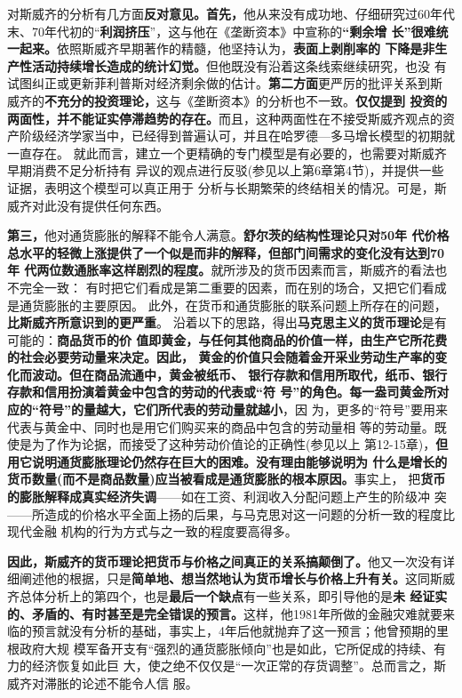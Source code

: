 对斯威齐的分析有几方面\textbf{反对意见。首先，}他从来没有成功地、仔细研究过60年代
末、70年代初的“\textbf{利润挤压}”，这与他在《垄断资本》中宣称的\textbf{“剩余增
  长”很难统一起来。}依照斯威齐早期著作的精髓，他坚持认为，\textbf{表面上剥削率的
  下降是非生产性活动持续增长造成的统计幻觉。}但他既没有沿着这条线索继续研究，也没
有试图纠正或更新菲利普斯对经济剩余做的估计。\textbf{第二方面}更严厉的批评关系到斯
威齐的\textbf{不充分的投资理论，}这与《垄断资本》的分析也不一致。\textbf{仅仅提到
  投资的两面性，并不能证实停滞趋势的存在。}而且，这种两面性在不接受斯威齐观点的资
产阶级经济学家当中，已经得到普遍认可，并且在哈罗德—多马增长模型的初期就一直存在。
就此而言，建立一个更精确的专门模型是有必要的，也需要对斯威齐早期消费不足分析持有
异议的观点进行反驳(参见以上第6章第4节)，并提供一些证据，表明这个模型可以真正用于
分析与长期繁荣的终结相关的情况。可是，斯威齐对此没有提供任何东西。

\textbf{第三，}他对通货膨胀的解释不能令人满意。\textbf{舒尔茨的结构性理论只对50年
  代价格总水平的轻微上涨提供了一个似是而非的解释，但部门间需求的变化没有达到70年
  代两位数通胀率这样剧烈的程度。}就所涉及的货币因素而言，斯威齐的看法也不完全一致：
有时把它们看成是第二重要的因素，而在别的场合，又把它们看成是通货膨胀的主要原因。
此外，在货币和通货膨胀的联系问题上所存在的问题，\textbf{比斯威齐所意识到的更严重}。
沿着以下的思路，得出\textbf{马克思主义的货币理论}是有可能的：\textbf{商品货币的价
  值即黄金，与任何其他商品的价值一样，由生产它所花费的社会必要劳动量来决定。因此，
  黄金的价值只会随着金开采业劳动生产率的变化而波动。但在商品流通中，黄金被纸币、
  银行存款和信用所取代，纸币、银行存款和信用扮演着黄金中包含的劳动的代表或“符
  号”的角色。每一盎司黄金所对应的“符号”的量越大，它们所代表的劳动量就越小}，因
为，更多的“符号”要用来代表与黄金中、同时也是用它们购买来的商品中包含的劳动量相
等的劳动量。既使是为了作为论据，而接受了这种劳动价值论的正确性(参见以上
第12-15章)，\textbf{但用它说明通货膨胀理论仍然存在巨大的困难。没有理由能够说明为
  什么是增长的货币数量(而不是商品数量)应当被看成是通货膨胀的根本原因。}事实上，
把\textbf{货币的膨胀解释成真实经济失调}——如在工资、利润收入分配问题上产生的阶级冲
突——所造成的价格水平全面上扬的后果，与马克思对这一问题的分析一致的程度比现代金融
机构的行为方式与之一致的程度要高得多。

\textbf{因此，斯威齐的货币理论把货币与价格之间真正的关系搞颠倒了。}他又一次没有详
细阐述他的根据，只是\textbf{简单地、想当然地认为货币增长与价格上升有关。}这同斯威
齐总体分析上的第四个，也是\textbf{最后一个缺点}有一些关系，即引导他的是\textbf{未
  经证实的、矛盾的、有时甚至是完全错误的预言。}这样，他1981年所做的金融灾难就要来
临的预言就没有分析的基础，事实上，4年后他就抛弃了这一预言；他曾预期的里根政府大规
模军备开支有“强烈的通货膨胀倾向”也是如此，它所促成的持续、有力的经济恢复如此巨
大，使之绝不仅仅是“一次正常的存货调整”。总而言之，斯威齐对滞胀的论述不能令人信
服。

